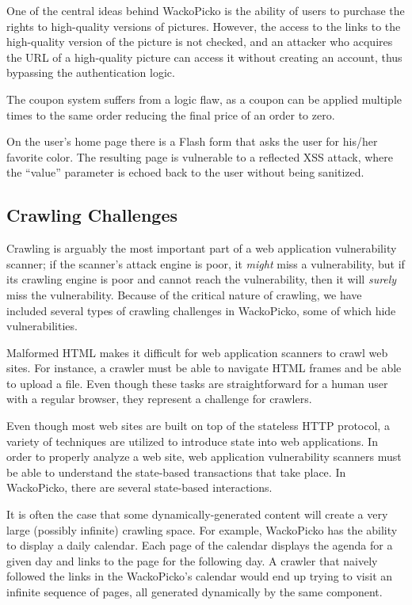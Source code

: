 One of the central ideas behind WackoPicko is the ability of users to purchase
the rights to high-quality versions of pictures. However, the access to the
links to the high-quality  version of the picture is not checked, and an attacker who acquires the URL of a
high-quality picture can access it without creating an account, thus
bypassing the authentication logic. 

The coupon
system suffers from a logic flaw, as a coupon can be applied multiple times to
the same order reducing the final price of an order to zero.

On the user's home page there is a Flash form that asks the user for his/her
favorite color. The resulting
page is vulnerable to a reflected XSS attack, where the ``value'' parameter
 is echoed back to the user without being sanitized.

\subsection{Crawling Challenges}
Crawling is arguably the most important part of a web application
vulnerability scanner; if the scanner's attack engine is poor, it
{\em might} miss a vulnerability, but if its crawling engine is poor and
cannot reach the vulnerability, then it will {\em surely} miss the
vulnerability. Because of the critical nature of crawling, we have included several types of
crawling challenges in WackoPicko, some of which hide vulnerabilities.

Malformed HTML makes it difficult for web application scanners to
crawl web sites. For instance, a crawler must be able to navigate
HTML frames and be able to upload a file. Even though 
these tasks are straightforward for a human user with a regular
browser, they represent a challenge for crawlers. 

Even though most web sites are built on top of the stateless
HTTP protocol, a variety of techniques are utilized to
introduce state into web applications. In order to properly
analyze a web site, web application vulnerability scanners must
be able to understand the state-based transactions that take
place. In WackoPicko, there are several state-based
interactions. 

It is often the case that some dynamically-generated content
will create a very large (possibly infinite) crawling space.
For example, WackoPicko has the ability to display a daily calendar. 
Each page of the calendar displays the agenda for a given day and
links to the page for the following day. A crawler that naively followed
the links in the WackoPicko's calendar would end up trying to visit an
infinite sequence of pages, all generated dynamically by the same
component.

